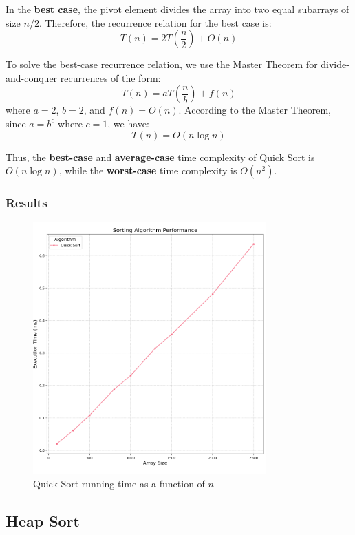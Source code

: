 \documentclass{article}
\begin{document}
In the \textbf{best case}, the pivot element divides the array into two equal subarrays of size $n/2$. Therefore, the recurrence relation for the best case is:
\[
	T(n) = 2T\left(\frac{n}{2}\right) + O(n)
\]

To solve the best-case recurrence relation, we use the Master Theorem for divide-and-conquer recurrences of the form:
\[
	T(n) = aT\left(\frac{n}{b}\right) + f(n)
\]
where $a = 2$, $b = 2$, and $f(n) = O(n)$. According to the Master Theorem, since $a = b^c$ where $c = 1$, we have:
\[
	T(n) = O(n \log n)
\]

Thus, the \textbf{best-case} and \textbf{average-case} time complexity of Quick Sort is \newline $O(n \log n)$, while the \textbf{worst-case} time complexity is $O(n^2)$.

\subsubsection{Results}
\begin{figure}[H]
	\includegraphics[width=0.8\textwidth]{images/quick_sort.png}
	\caption{Quick Sort running time as a function of $n$}
\end{figure}


\subsection{Heap Sort}
\end{document}
